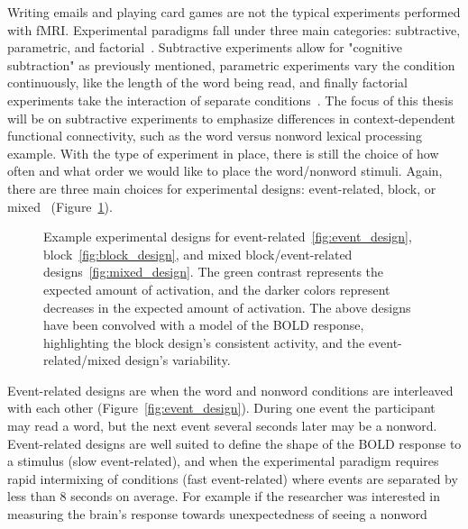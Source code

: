 \documentclass[phd,figures,tables,ackpage,abstractpage,publicabstractpage]{uithesis}
\begin{document}
Writing emails and playing card games are not the typical experiments performed with fMRI.
Experimental paradigms fall under three main categories: subtractive, parametric, and factorial~\cite{Friston1994}.
Subtractive experiments allow for "cognitive subtraction" as previously mentioned,
parametric experiments vary the condition continuously, like the length of the word being read, and finally
factorial experiments take the interaction of separate conditions~\cite{Friston1994}.
The focus of this thesis will be on subtractive experiments to emphasize differences
in context-dependent functional connectivity, such as the word versus nonword lexical processing example.
With the type of experiment in place, there is still the choice of how often and
what order we would like to place the word/nonword stimuli.
Again, there are three main choices for experimental designs:
event-related, block, or mixed~\cite{Friston1995b,Buckner1996,Petersen2012} (Figure~\ref{fig:example_designs}).
\begin{figure}[H]
  \centering
  \hfill
  \hfill
  \caption[Example Experimental Designs]{
    Example experimental designs for event-related~\ref{fig:event_design},
    block~\ref{fig:block_design},
    and mixed block/event-related designs~\ref{fig:mixed_design}.
    The green contrast represents the expected amount of activation, and the darker
    colors represent decreases in the expected amount of activation.
    The above designs have been convolved with a model of the BOLD
    response, highlighting the block design's consistent activity,
    and the event-related/mixed design's variability.
  }
  \label{fig:example_designs}
\end{figure}
Event-related designs are when the word and nonword conditions are interleaved with each other (Figure~\ref{fig:event_design}).
During one event the participant may read a word, but the next event several seconds later may be
a nonword.
Event-related designs are well suited to define the shape of the BOLD response to a stimulus (slow event-related),
and when the experimental paradigm requires rapid intermixing of conditions
(fast event-related) where events are separated by less than 8 seconds on average.
For example if the researcher
was interested in measuring the brain's response towards unexpectedness of seeing a nonword
\end{document}
